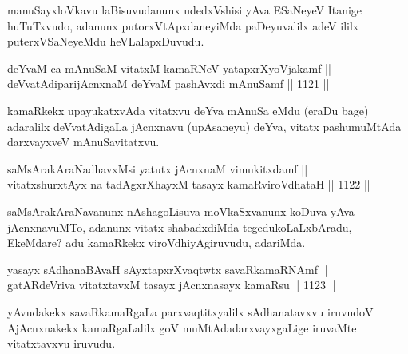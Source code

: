 \begin{artha}
manuSayxloVkavu laBisuvudanunx udedxVshisi yAva ESaNeyeV Itanige huTuTxvudo, adanunx putorxVtApxdaneyiMda paDeyuvalilx adeV ililx puterxVSaNeyeMdu heVLalapxDuvudu.
\end{artha}


\begin{shl}
deYvaM ca mAnuSaM vitatxM kamaRNeV yatapxrXyoVjakamf ||  \\
deVvatAdiparijAcnxnaM deYvaM pashAvxdi mAnuSamf ||  1121 ||  
\end{shl}

\begin{artha}
kamaRkekx upayukatxvAda vitatxvu deYva mAnuSa eMdu (eraDu bage) adaralilx deVvatAdigaLa jAcnxnavu (upAsaneyu) deYva, vitatx pashumuMtAda darxvayxveV mAnuSavitatxvu.
\end{artha}


\begin{shl}
saMsArakAraNadhavxMsi yatutx jAcnxnaM vimukitxdamf || \\
vitatxshurxtAyx na tadAgxrXhayxM tasayx kamaRviroVdhataH ||  1122 ||  
\end{shl}

\begin{artha}
saMsArakAraNavanunx nAshagoLisuva moVkaSxvanunx koDuva yAva jAcnxnavuMTo, adanunx vitatx shabadxdiMda tegedukoLaLxbAradu, EkeMdare? adu kamaRkekx viroVdhiyAgiruvudu, adariMda.
\end{artha}


\begin{shl}
yasayx sAdhanaBAvaH sAyxtapxrXvaqtwtx savaRkamaRNAmf || \\
\footnotemark[1]gatARdeVriva vitatxtavxM tasayx jAcnxnasayx kamaRsu ||  1123 ||  
\end{shl}

\begin{artha}
yAvudakekx savaRkamaRgaLa parxvaqtitxyalilx sAdhanatavxvu iruvudoV AjAcnxnakekx kamaRgaLalilx goV muMtAdadarxvayxgaLige iruvaMte vitatxtavxvu iruvudu.
\end{artha}

